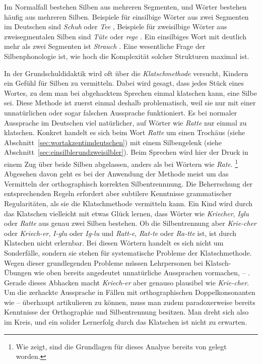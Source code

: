 Im Normalfall bestehen Silben aus mehreren Segmenten, und Wörter bestehen häufig aus mehreren Silben.
Beispiele für einsilbige Wörter aus zwei Segmenten im Deutschen sind \textit{Schuh} \textipa{[Su:]} oder \textit{Tee} \textipa{[te:]}, Beispiele für zweisilbige Wörter aus zweisegmentalen Silben sind \textit{Tüte} \textipa{[ty:t@]} oder \textit{rege} \textipa{[Ke:g@]}.
Ein einsilbiges Wort mit deutlich mehr als zwei Segmenten ist \textit{Strauch} \textipa{[StK\t{aO}X]}.
Eine wesentliche Frage der Silbenphonologie ist, wie hoch die Komplexität solcher Strukturen maximal ist.


In der Grundschuldidaktik wird oft über die \textit{Klatschmethode} versucht, Kindern ein Gefühl für Silben zu vermitteln.
Dabei wird gesagt, dass jedes Stück eines Wortes, zu dem man bei abgehacktem Sprechen einmal klatschen kann, eine Silbe sei.
Diese Methode ist zuerst einmal deshalb problematisch, weil sie nur mit einer unnatürlichen oder sogar falschen Aussprache funktioniert.
Es bei normaler Aussprache im Deutschen viel natürlicher, auf Wörter wie \textit{Ratte} \textipa{[Kat@]} nur einmal zu klatschen.
Konkret handelt es sich beim Wort \textit{Ratte} um einen Trochäus (siehe Abschnitt~\ref{sec:wortakzentimdeutschen}) mit einem Silbengelenk (siehe Abschnitt~\ref{sec:einsilblerundzweisilbler}).
Beim Sprechen wird hier der Druck in einem Zug über beide Silben abgelassen, anders als bei Wörtern wie \textit{Rate}.%
\footnote{Wie \citet[15--16]{Maas2002} zeigt, sind die Grundlagen für dieses Analyse bereits von \citet{Sievers1876} gelegt worden.}
Abgesehen davon geht es bei der Anwendung der Methode meist um das Vermitteln der orthographisch korrekten Silbentrennnung.
Die Beherrschung der entsprechenden Regeln erfordert aber subtilere Kenntnisse grammatischer Regularitäten, als sie die Klatschmethode vermitteln kann.
Ein Kind wird durch das Klatschen vielleicht mit etwas Glück lernen, dass Wörter wie \textit{Kriecher}, \textit{Iglu} oder \textit{Ratte} aus genau zwei Silben bestehen.
Ob die Silbentrennung aber \textit{Krie-cher} oder \textit{Kriech-er}, \textit{I-glu} oder \textit{Ig-lu} und \textit{Ratt-e}, \textit{Rat-te} oder \textit{Ra-tte} ist, ist durch Klatschen nicht erlernbar.
Bei diesen Wörtern handelt es sich nicht um Sonderfälle, sondern sie stehen für systematische Probleme der Klatschmethode.
Wegen dieser grundlegenden Probleme müssen Lehrpersonen bei Klatsch-Übungen wie oben bereits angedeutet unnatürliche Aussprachen vormachen, \zB \textipa{[Kat]} -- \textipa{[te:]}.
Gerade dieses Abhacken macht \textit{Kriech-er} aber genauso plausibel wie \textit{Krie-cher}.
Um die zerhackte Aussprache in Fällen mit orthographischen Doppelkonsonanten wie \textipa{[Kat]} -- \textipa{[te:]} überhaupt artikulieren zu können, muss man zudem paradoxerweise bereits Kenntnisse der Orthographie und Silbentrennung besitzen.
Man dreht sich also im Kreis, und ein solider Lernerfolg durch das Klatschen ist nicht zu erwarten.

